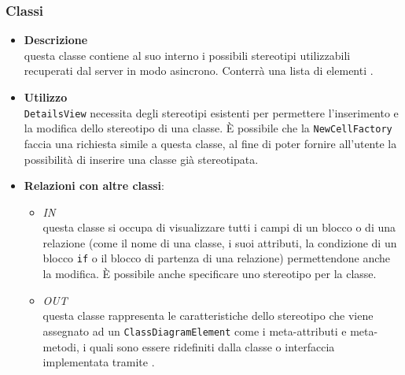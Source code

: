\subsubsection{Classi}
\label{\nogloxy{swedesigner::client::model::utility::ProjectStereotypes}}
\begin{itemize}
\item \textbf{Descrizione}\\
questa classe contiene al suo interno i possibili stereotipi utilizzabili recuperati dal server in modo asincrono. Conterrà una lista di elementi .
\item \textbf{Utilizzo}\\
\texttt{DetailsView} necessita degli stereotipi esistenti per permettere l'inserimento e la modifica dello stereotipo di una classe. È possibile che la \texttt{NewCellFactory} faccia una richiesta simile a questa classe, al fine di poter fornire all'utente la possibilità di inserire una classe già stereotipata. 
\item \textbf{Relazioni con altre classi}:
\begin{itemize}
\item \textit{IN} \hyperref[\nogloxy{swedesigner::client::view::DetailsView}]{}\\
questa classe si occupa di visualizzare tutti i campi di un blocco o di una relazione (come il nome di una classe, i suoi attributi, la condizione di un blocco \texttt{if} o il blocco di partenza di una relazione) permettendone anche la modifica. È possibile anche specificare uno stereotipo per la classe.

\item \textit{OUT} \hyperref[\nogloxy{swedesigner::client::model::celltypes::HxStereotype}]{}\\
questa classe rappresenta le caratteristiche dello stereotipo che viene assegnato ad un \texttt{ClassDiagramElement} come i meta-attributi e meta-metodi, i quali sono essere ridefiniti dalla classe o interfaccia implementata tramite \proj{}. 
\end{itemize}
\end{itemize}
\subsection{}
\label{\nogloxy{swedesigner::client::view}}
